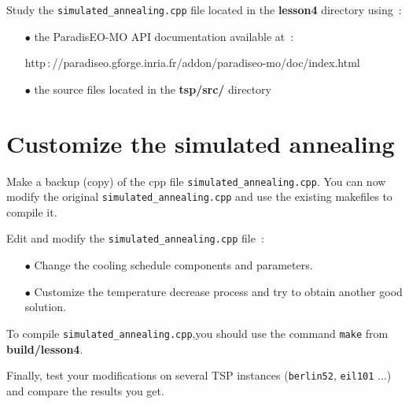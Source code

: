 \documentclass[a4paper]{article}
\begin{document}
    Study the {\tt simulated\_annealing.cpp} file located in the {\bf lesson4} directory
    using~:
    \begin{itemize}
       \item[$\bullet$] the ParadisEO-MO API documentation available at~:

       \hspace{1cm}http$\,:$//paradiseo.gforge.inria.fr/addon/paradiseo-mo/doc/index.html
       \item[$\bullet$] the source files located in the {\bf tsp/src/} directory
    \end{itemize}

\section{Customize the simulated annealing}

   Make a backup (copy) of the cpp file {\tt simulated\_annealing.cpp}. You can now modify the
   original {\tt simulated\_annealing.cpp} and use the existing makefiles to compile it.

     Edit and modify the {\tt simulated\_annealing.cpp} file~:
    \begin{itemize}
       \item[$\bullet$] Change the cooling schedule components and parameters.
       \item[$\bullet$] Customize the temperature decrease process and try to obtain another good solution.
    \end{itemize}

    \smallskip
    To compile {\tt simulated\_annealing.cpp},you should use the
    command {\tt make} from {\bf build/lesson4}.

    \medskip
    Finally, test your modifications on several TSP instances ({\tt berlin52},
    {\tt eil101} ...) and compare the results you get.
\end{document}
